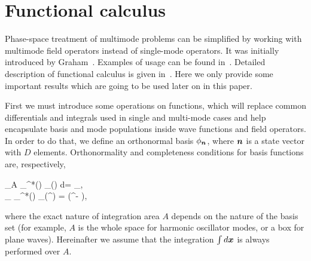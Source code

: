 \section{Functional calculus}

Phase-space treatment of multimode problems can be simplified by working with multimode field operators instead of single-mode operators.
It was initially introduced by Graham~\cite{Graham1970,Graham1970a}.
Examples of usage can be found in~\cite{Steel1998,Norrie2006a}.
Detailed description of functional calculus is given in~\cite{Dalton2011}.
Here we only provide some important results which are going to be used later on in this paper.

First we must introduce some operations on functions, which will replace common differentials and integrals used in single and multi-mode cases and help encapsulate basis and mode populations inside wave functions and field operators.
In order to do that, we define an orthonormal basis $\phi_{\boldsymbol{n}}$, where $\boldsymbol{n}$ is a state vector with $D$ elements.
Orthonormality and completeness conditions for basis functions are, respectively,
\begin{eqns}
	\int\limits_A \phi_{\nvec}^*(\xvec) \phi_{\mvec}(\xvec) d\xvec = \delta_{\nvec\mvec}, \\
	\sum_{\nvec} \phi_{\nvec}^*(\xvec) \phi_{\nvec}(\xvec^\prime) = \delta(\xvec^\prime - \xvec),
\end{eqns}
where the exact nature of integration area $A$ depends on the nature of the basis set (for example, $A$ is the whole space for harmonic oscillator modes, or a box for plane waves).
Hereinafter we assume that the integration $\int d\boldsymbol{x}$ is always performed over $A$.

